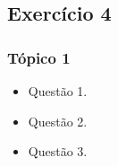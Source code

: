 \subsection[Exercício 4]{Exercício 4}\label{subsec:exercicio-4}



\begin{frame}[t]\frametitle{Tópico 1}

\begin{itemize}
  \justifying{}
  \setlength\itemsep{1em}
  \item Questão 1.
  \item Questão 2.
  \item Questão 3.
\end{itemize}

\end{frame}
